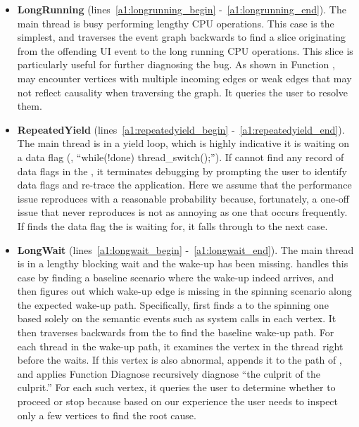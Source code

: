 \begin{itemize}

	\item \textbf{LongRunning} (lines~\ref{a1:longrunning_begin}
		-~\ref{a1:longrunning_end}). The main thread is busy performing lengthy CPU
		operations. This case is the simplest, and \xxx traverses the event graph
		backwards to find a slice originating from the offending UI event to the
		long running CPU operations. This slice is particularly useful for further
		diagnosing the bug. As shown in Function , \xxx may
		encounter vertices with multiple incoming edges or weak edges that may not
		reflect causality when traversing the graph. It queries the user to resolve
		them.

	\item \textbf{RepeatedYield} (lines~\ref{a1:repeatedyield_begin}
		-~\ref{a1:repeatedyield_end}). The main thread is in a yield loop, which
		is highly indicative it is waiting on a data flag (\eg, ``while(!done)
		thread\_switch();''). If \xxx cannot find any record of data flags in the
		\spinningnode, it terminates debugging by prompting the user to identify data
		flags and re-trace the application. Here we assume that the performance issue
		reproduces with a reasonable probability because, fortunately, a one-off issue
		that never reproduces is not as annoying as one that occurs frequently. If
		\xxx finds the data flag the \spinningnode is waiting for, it falls through to
		the next case.

	\item \textbf{LongWait} (lines~\ref{a1:longwait_begin}
		-~\ref{a1:longwait_end}). The main thread is in a lengthy blocking wait and
		the wake-up has been missing. \xxx handles this case by finding a baseline
		scenario where the wake-up indeed arrives, and then figures out which wake-up
		edge is missing in the spinning scenario along the expected wake-up path.
		Specifically, \xxx first finds a \similarnode to the spinning one based solely
		on the semantic events such as system calls in each vertex. It then traverses
		backwards from the \similarnode to find the baseline wake-up path. For each
		thread in the wake-up path, it examines the vertex in the thread right before
		the \spinningnode waits. If this vertex is also abnormal, \xxx appends it
		to the path of \rootcausenodes, and applies Function Diagnose recursively
		diagnose ``the culprit of the culprit.'' For each such vertex, it queries the
		user to determine whether to proceed or stop because based on our experience
		the user needs to inspect only a few vertices to find the root cause.

\end{itemize}
